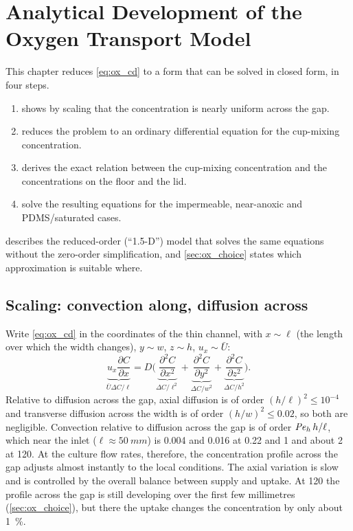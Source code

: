 \chapter{Analytical Development of the Oxygen Transport Model}
\label{ch:o2analytical}

This chapter reduces \cref{eq:ox_cd} to a form that can be solved in closed form, in four steps.
\begin{enumerate}
\item {} shows by scaling that the concentration is nearly uniform across the gap.
\item {} reduces the problem to an ordinary differential equation for the cup-mixing concentration.
\item {} derives the exact relation between the cup-mixing concentration and the concentrations on the floor and the lid.
\item {} solve the resulting equations for the impermeable, near-anoxic and PDMS/saturated cases.
\end{enumerate}
 describes the reduced-order (``1.5-D'') model that solves the same equations without the zero-order simplification, and \cref{sec:ox_choice} states which approximation is suitable where.

\section{Scaling: convection along, diffusion across}
\label{sec:ox_scaling}

Write \cref{eq:ox_cd} in the coordinates of the thin channel, with $x\sim\ell$ (the length over which the width changes), $y\sim w$, $z\sim h$, $u_x\sim\bar U$:
\begin{equation}
\underbrace{u_x\frac{\partial C}{\partial x}}_{\bar U\Delta C/\ell}
=D\Big(\underbrace{\frac{\partial^2C}{\partial x^2}}_{\Delta C/\ell^2}
+\underbrace{\frac{\partial^2C}{\partial y^2}}_{\Delta C/w^2}
+\underbrace{\frac{\partial^2C}{\partial z^2}}_{\Delta C/h^2}\Big).
\label{eq:ox_scaling}
\end{equation}
Relative to diffusion across the gap, axial diffusion is of order $(h/\ell)^2\le10^{-4}$ and transverse diffusion across the width is of order $(h/w)^2\le0.02$, so both are negligible. Convection relative to diffusion across the gap is of order $\mathit{Pe}_h\,h/\ell$, which near the inlet ($\ell\approx\SI{50}{mm}$) is 0.004 and 0.016 at 0.22 and \SI{1}{\uLmin} and about 2 at \SI{120}{\uLmin}. At the culture flow rates, therefore, the concentration profile across the gap adjusts almost instantly to the local conditions. The axial variation is slow and is controlled by the overall balance between supply and uptake. At \SI{120}{\uLmin} the profile across the gap is still developing over the first few millimetres (\cref{sec:ox_choice}), but there the uptake changes the concentration by only about \SI{1}{\percent}.

